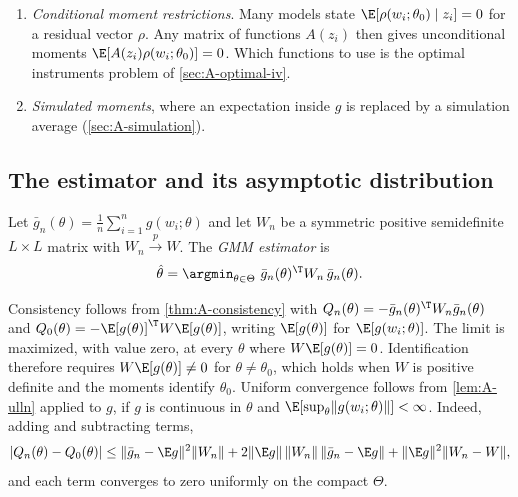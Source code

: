 \begin{enumerate}
  $mc_{jt}(\theta) = p_{jt} + [(\Omega_t \odot \Delta_t^\top)^{-1}s_t]_j$. In this item $\Omega_t$ is the ownership
  matrix of market $t$, and $\Delta_t$ has $(j,k)$ element $\frac{\partial s_{jt}}{\partial p_{kt}}$
  (\cref{ch:diffprod}). If
  $mc_{jt} = w_{jt}\gamma + \omega_{jt}$, the cost moment is $g = z^s_{jt}\{mc_{jt}(\theta) - w_{jt}\gamma\}$.
  \item \emph{Conditional moment restrictions}. Many models state $\E[\rho(w_i;\theta_0) \mid z_i] = 0$ for a residual vector
  $\rho$. Any matrix of functions $A(z_i)$ then gives unconditional moments $\E[A(z_i)\rho(w_i;\theta_0)] = 0$. Which
  functions to use is the optimal instruments problem of \cref{sec:A-optimal-iv}.
  \item \emph{Simulated moments}, where an expectation inside $g$ is replaced by a simulation average
  (\cref{sec:A-simulation}).
\end{enumerate}

\subsection{The estimator and its asymptotic distribution}\label{sec:A-gmm-asy}

\begin{definition}\label{def:A-gmm}
Let $\bar g_n(\theta) = \frac{1}{n}\sum_{i=1}^n g(w_i;\theta)$ and let $W_n$ be a symmetric positive semidefinite
$L \times L$ matrix with $W_n \xrightarrow{p} W$. The \emph{GMM estimator} is
\begin{equation}\label{eq:A-gmm}
  \hat\theta = \argmin_{\theta \in \Theta}\ \bar g_n(\theta)^\T W_n\,\bar g_n(\theta).
\end{equation}
\end{definition}

Consistency follows from \cref{thm:A-consistency} with $Q_n(\theta) = -\bar g_n(\theta)^\T W_n\bar g_n(\theta)$ and
$Q_0(\theta) = -\E[g(\theta)]^\T W\E[g(\theta)]$, writing $\E[g(\theta)]$ for $\E[g(w_i;\theta)]$. The limit is
maximized, with value zero, at every $\theta$ where $W\E[g(\theta)] = 0$. Identification therefore requires
$W\E[g(\theta)] \ne 0$ for $\theta \ne \theta_0$, which holds when $W$ is positive definite and the moments identify
$\theta_0$. Uniform convergence follows from \cref{lem:A-ulln} applied to $g$, if $g$ is continuous in $\theta$ and
$\E[\sup_\theta\lVert g(w_i;\theta)\rVert] < \infty$. Indeed, adding and subtracting terms,
\begin{equation*}
  \lvert Q_n(\theta) - Q_0(\theta)\rvert
  \le \lVert\bar g_n - \E g\rVert^2\lVert W_n\rVert + 2\lVert\E g\rVert\,\lVert W_n\rVert\,\lVert\bar g_n - \E g\rVert
  + \lVert\E g\rVert^2\lVert W_n - W\rVert,
\end{equation*}
and each term converges to zero uniformly on the compact $\Theta$.

